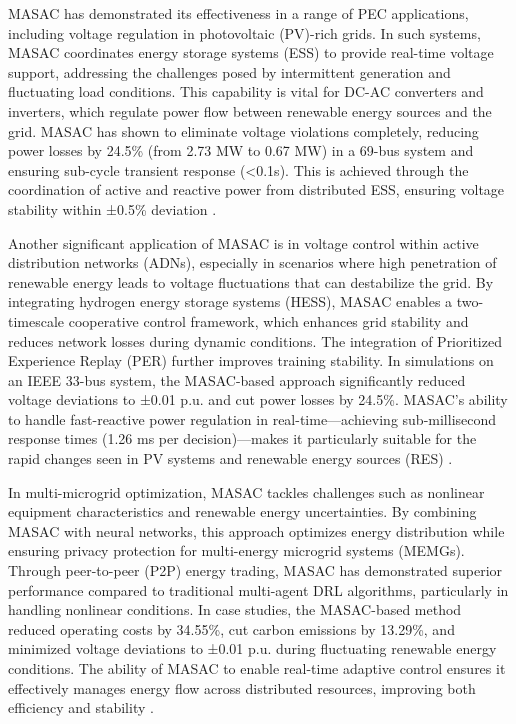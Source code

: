 MASAC has demonstrated its effectiveness in a range of PEC applications, including voltage regulation in photovoltaic (PV)-rich grids. In such systems, MASAC coordinates energy storage systems (ESS) to provide real-time voltage support, addressing the challenges posed by intermittent generation and fluctuating load conditions. This capability is vital for DC-AC converters and inverters, which regulate power flow between renewable energy sources and the grid. MASAC has shown to eliminate voltage violations completely, reducing power losses by 24.5\% (from 2.73 MW to 0.67 MW) in a 69-bus system and ensuring sub-cycle transient response (<0.1s). This is achieved through the coordination of active and reactive power from distributed ESS, ensuring voltage stability within ±0.5\% deviation \cite{10537984}.

Another significant application of MASAC is in voltage control within active distribution networks (ADNs), especially in scenarios where high penetration of renewable energy leads to voltage fluctuations that can destabilize the grid. By integrating hydrogen energy storage systems (HESS), MASAC enables a two-timescale cooperative control framework, which enhances grid stability and reduces network losses during dynamic conditions. The integration of Prioritized Experience Replay (PER) further improves training stability. In simulations on an IEEE 33-bus system, the MASAC-based approach significantly reduced voltage deviations to ±0.01 p.u. and cut power losses by 24.5\%. MASAC's ability to handle fast-reactive power regulation in real-time—achieving sub-millisecond response times (1.26 ms per decision)—makes it particularly suitable for the rapid changes seen in PV systems and renewable energy sources (RES) \cite{zhang2025hydrogen}.

In multi-microgrid optimization, MASAC tackles challenges such as nonlinear equipment characteristics and renewable energy uncertainties. By combining MASAC with neural networks, this approach optimizes energy distribution while ensuring privacy protection for multi-energy microgrid systems (MEMGs). Through peer-to-peer (P2P) energy trading, MASAC has demonstrated superior performance compared to traditional multi-agent DRL algorithms, particularly in handling nonlinear conditions. In case studies, the MASAC-based method reduced operating costs by 34.55\%, cut carbon emissions by 13.29\%, and minimized voltage deviations to ±0.01 p.u. during fluctuating renewable energy conditions. The ability of MASAC to enable real-time adaptive control ensures it effectively manages energy flow across distributed resources, improving both efficiency and stability \cite{cui2024multi}.

